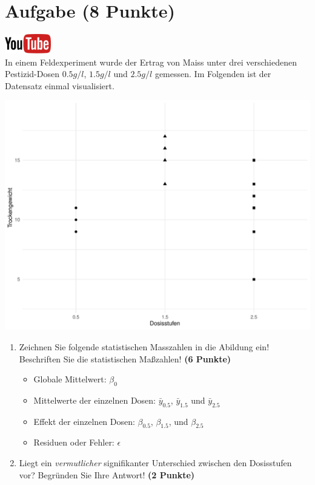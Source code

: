 \documentclass[a4paper, 9pt]{scrartcl}\usepackage[]{graphicx}\usepackage[]{xcolor}
\makeatletter
\def\maxwidth{ %
  \ifdim\Gin@nat@width>\linewidth
    \linewidth
  \else
    \Gin@nat@width
  \fi
}
\newenvironment{knitrout}{}{} %
\makeatother
\begin{document}
\section{Aufgabe \hfill (8 Punkte)}

\hfill\href{https://youtu.be/Q7xtQJoOmQI}{\includegraphics[width =
  2cm]{img/youtube}}\\[1Ex]



In einem Feldexperiment wurde der Ertrag von Maiss unter drei verschiedenen
Pestizid-Dosen $0.5 g/l$, $1.5 g/l$ und $2.5 g/l$ gemessen. Im Folgenden ist der
Datensatz einmal visualisiert.

\begin{knitrout}
\color{fgcolor}

{\centering \includegraphics[width=\maxwidth]{img/anova-01-a-1} 

}


\end{knitrout}

\begin{enumerate}
\item Zeichnen Sie folgende statistischen Masszahlen in die Abildung ein!
  Beschriften Sie die statistischen Ma{\ss}zahlen! \textbf{(6 Punkte)}
  \begin{itemize}
  \item Globale Mittelwert: $\beta_0$
  \item Mittelwerte der einzelnen Dosen: $\bar{y}_{0.5}$, $\bar{y}_{1.5}$ und $\bar{y}_{2.5}$
  \item Effekt der einzelnen Dosen: $\beta_{0.5}$, $\beta_{1.5}$,
    und $\beta_{2.5}$
  \item Residuen oder Fehler: $\epsilon$
  \end{itemize}
\item Liegt ein \textit{vermutlicher} signifikanter Unterschied zwischen
  den Dosisstufen vor? Begr{\"u}nden Sie Ihre Antwort! \textbf{(2 Punkte)}
\end{enumerate}
 
\end{document}
